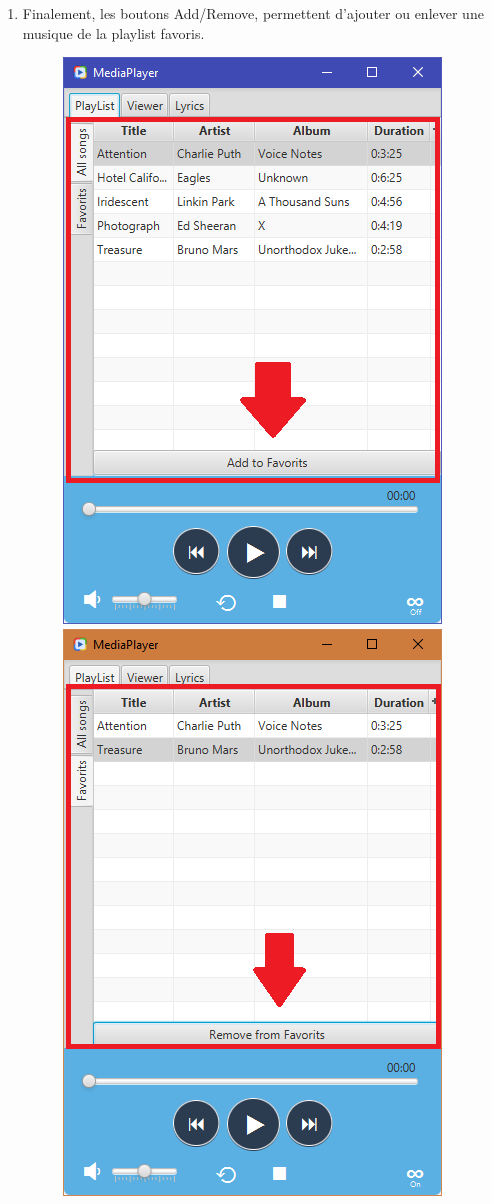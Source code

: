 \documentclass[a4paper,12pt]{report} %
\begin{document}
\begin{enumerate}
		\newpage
		\item Finalement, les boutons Add/Remove, permettent d'ajouter ou enlever une musique de la playlist favoris.
   			\begin{figure}[ht] 		
				\centering
  				\includegraphics[scale=0.6]{add}
  				\hspace{5mm}
  				\includegraphics[scale=0.6]{remove}
			\end{figure} 
	\end{enumerate}
	
\end{document}
